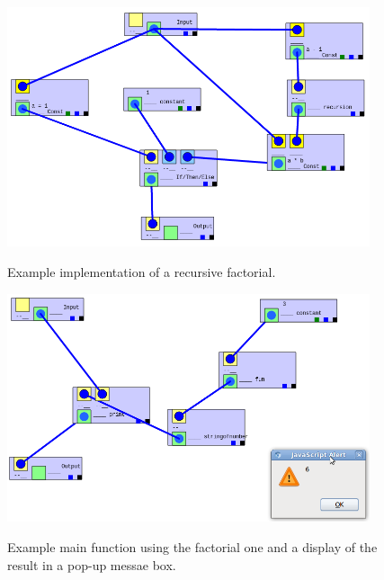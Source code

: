 \documentclass[12pt,UTF8,a4]{article}
\begin{document}
\begin{figure}[h!]
\center
\includegraphics[width=0.95\textwidth]{./images/factorial.png} \\
\caption{Example implementation of a recursive factorial.}\label{fig:fact}
\end{figure}

\begin{figure}[h!]
\center
\includegraphics[width=0.95\textwidth]{./images/using factorial.png} \\
\caption{Example main function using the factorial one and a display of the result in a pop-up messae box.}\label{fig:use_fact}
\end{figure}
\end{document}
